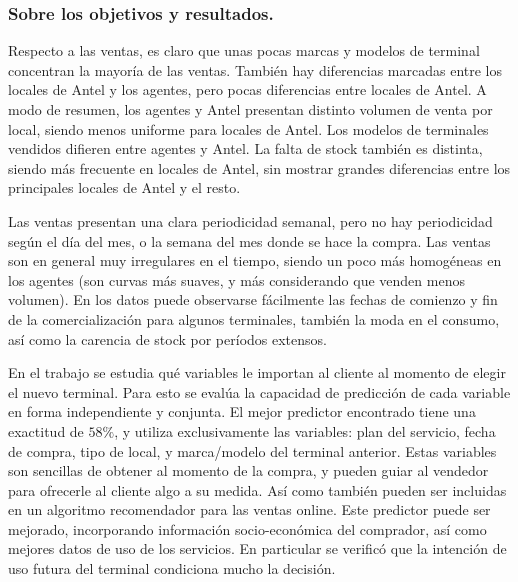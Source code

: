 \subsubsection{Sobre los objetivos y resultados.}
Respecto a las ventas, 
es claro que unas pocas marcas y modelos de terminal concentran la mayoría de las ventas.
También hay diferencias marcadas entre los locales de Antel y los agentes, 
pero pocas diferencias entre locales de Antel. 
A modo de resumen, los agentes y Antel presentan distinto volumen de venta por local, 
siendo menos uniforme para locales de Antel. 
Los modelos de terminales vendidos difieren entre agentes y Antel.
La falta de stock también es distinta, siendo más frecuente en locales de Antel, 
sin mostrar grandes diferencias entre los principales locales de Antel y el resto.

Las ventas presentan una clara periodicidad semanal, pero no hay periodicidad según el día del mes, 
o la semana del mes donde se hace la compra.
Las ventas son en general muy irregulares en el tiempo, siendo un poco más homogéneas en los agentes
(son curvas más suaves, y más considerando que venden menos volumen). 
En los datos puede observarse fácilmente las fechas de comienzo y fin de la comercialización para algunos terminales, 
también la moda en el consumo, así como la carencia de stock por períodos extensos.

En el trabajo se estudia qué variables le importan al cliente al momento de elegir el nuevo terminal.
Para esto se evalúa la capacidad de predicción de cada variable en forma independiente y conjunta.
El mejor predictor encontrado tiene una exactitud de $58\%$, 
y utiliza exclusivamente las variables: plan del servicio, fecha de compra, tipo de local, y marca/modelo del terminal
anterior. Estas variables son sencillas de obtener al momento de la compra, y pueden guiar al
vendedor para ofrecerle al cliente algo a su medida. Así como también pueden ser incluidas en un
algoritmo recomendador para las ventas online.
Este predictor puede ser mejorado, incorporando información socio-económica del comprador, así como mejores datos de uso de los servicios.
En particular se verificó que la intención de uso futura del terminal condiciona mucho la decisión.

